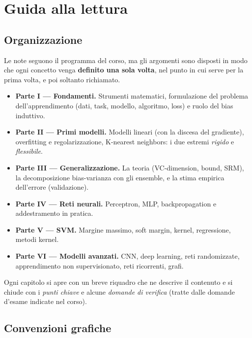 \chapter{Guida alla lettura}

\section*{Organizzazione}

Le note seguono il programma del corso, ma gli argomenti sono disposti in modo che ogni concetto venga
\textbf{definito una sola volta}, nel punto in cui serve per la prima volta, e poi soltanto richiamato.

\begin{itemize}
  \item \textbf{Parte I --- Fondamenti.} Strumenti matematici, formulazione del problema dell'apprendimento
        (dati, task, modello, algoritmo, loss) e ruolo del bias induttivo.
  \item \textbf{Parte II --- Primi modelli.} Modelli lineari (con la discesa del gradiente), overfitting e
        regolarizzazione, K-nearest neighbors: i due estremi \emph{rigido} e \emph{flessibile}.
  \item \textbf{Parte III --- Generalizzazione.} La teoria (VC-dimension, bound, SRM), la decomposizione
        bias-varianza con gli ensemble, e la stima empirica dell'errore (validazione).
  \item \textbf{Parte IV --- Reti neurali.} Perceptron, MLP, backpropagation e addestramento in pratica.
  \item \textbf{Parte V --- SVM.} Margine massimo, soft margin, kernel, regressione, metodi kernel.
  \item \textbf{Parte VI --- Modelli avanzati.} CNN, deep learning, reti randomizzate, apprendimento non
        supervisionato, reti ricorrenti, grafi.
\end{itemize}

Ogni capitolo si apre con un breve riquadro che ne descrive il contenuto e si chiude con i \emph{punti chiave}
e alcune \emph{domande di verifica} (tratte dalle domande d'esame indicate nel corso).

\section*{Convenzioni grafiche}

